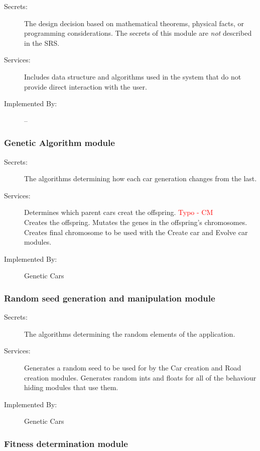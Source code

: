 \documentclass[12pt, titlepage]{article}
\begin{document}
\begin{description}
\item[Secrets:] The design decision based on mathematical theorems, physical
  facts, or programming considerations. The secrets of this module are
  \emph{not} described in the SRS.
\item[Services:] Includes data structure and algorithms used in the system that
  do not provide direct interaction with the user. 
\item[Implemented By:] --
\end{description}

\subsubsection{Genetic Algorithm module}

\begin{description}
\item[Secrets:] The algorithms determining how each car generation changes from 
the last.
\item[Services:] Determines which parent cars creat the offspring. \textcolor{red}{Typo - CM} \\ Creates the 
offspring. Mutates the genes in the offspring's chromosomes. Creates final 
chromosome to be used with the Create car and Evolve car modules.
\item[Implemented By:] Genetic Cars
\end{description}

\subsubsection{Random seed generation and manipulation module}

\begin{description}
\item[Secrets:] The algorithms determining the random elements of the 
application.
\item[Services:] Generates a random seed to be used for by the Car creation and 
Road creation modules. Generates random ints and floats for all of the behaviour 
hiding modules that use them.
\item[Implemented By:] Genetic Cars
\end{description}

\subsubsection{Fitness determination module}
\end{document}
